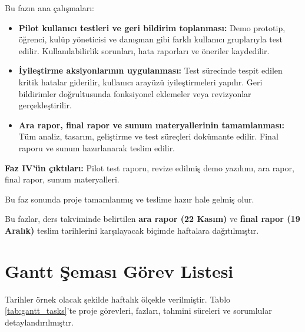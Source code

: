 \documentclass[a4paper,12pt]{report}
\begin{document}
Bu fazın ana çalışmaları:

\begin{itemize}
    \item \textbf{Pilot kullanıcı testleri ve geri bildirim toplanması:} Demo prototip, öğrenci, kulüp yöneticisi ve danışman gibi farklı kullanıcı gruplarıyla test edilir. Kullanılabilirlik sorunları, hata raporları ve öneriler kaydedilir.

    \item \textbf{İyileştirme aksiyonlarının uygulanması:} Test sürecinde tespit edilen kritik hatalar giderilir, kullanıcı arayüzü iyileştirmeleri yapılır. Geri bildirimler doğrultusunda fonksiyonel eklemeler veya revizyonlar gerçekleştirilir.

    \item \textbf{Ara rapor, final rapor ve sunum materyallerinin tamamlanması:} Tüm analiz, tasarım, geliştirme ve test süreçleri dokümante edilir. Final raporu ve sunum hazırlanarak teslim edilir.
\end{itemize}

\textbf{Faz IV'ün çıktıları:} Pilot test raporu, revize edilmiş demo yazılımı, ara rapor, final rapor, sunum materyalleri.

Bu faz sonunda proje tamamlanmış ve teslime hazır hale gelmiş olur.

Bu fazlar, ders takviminde belirtilen \textbf{ara rapor (22 Kasım)} ve \textbf{final rapor (19 Aralık)} teslim tarihlerini karşılayacak biçimde haftalara dağıtılmıştır.

\section{Gantt Şeması Görev Listesi}

Tarihler örnek olacak şekilde haftalık ölçekle verilmiştir. Tablo \ref{tab:gantt_tasks}'te proje görevleri, fazları, tahmini süreleri ve sorumlular detaylandırılmıştır.
\end{document}
